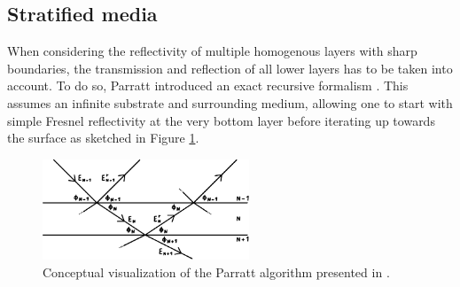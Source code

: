 \subsection{Stratified media}

When considering the reflectivity of multiple homogenous layers with sharp boundaries, the transmission and reflection of all lower layers
has to be taken into account. To do so, Parratt introduced an exact recursive formalism \cite{Parratt_1954}. This assumes an infinite substrate
and surrounding medium, allowing one to start with simple Fresnel reflectivity at the very bottom layer before iterating up towards the surface
as sketched in Figure \ref{fig:parratt}.

\begin{figure}[H]
	\centering
	\includegraphics[width=0.55\textwidth]{content/graphics/parratt.pdf}
	\caption{Conceptual visualization of the Parratt algorithm presented in \cite{Parratt_1954}.}
	\label{fig:parratt}
\end{figure}

